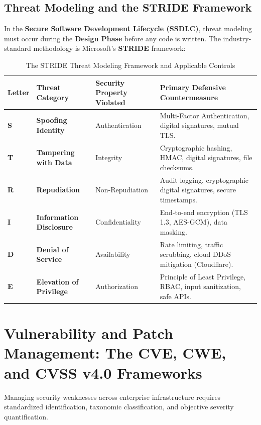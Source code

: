 \subsection{Threat Modeling and the STRIDE Framework}

In the \textbf{Secure Software Development Lifecycle (SSDLC)}, threat modeling must occur during the \textbf{Design Phase} before any code is written. The industry-standard methodology is Microsoft's \textbf{STRIDE} framework:

\begin{table}[htbp]
\centering
\caption{The STRIDE Threat Modeling Framework and Applicable Controls}
\label{tab:stride_model}
\begin{tabularx}{\textwidth}{l p{3.2cm} p{3.8cm} X}
\toprule
\textbf{Letter} & \textbf{Threat Category} & \textbf{Security Property Violated} & \textbf{Primary Defensive Countermeasure} \\
\midrule
\textbf{S} & \textbf{Spoofing Identity} & Authentication & Multi-Factor Authentication, digital signatures, mutual TLS. \\
\textbf{T} & \textbf{Tampering with Data} & Integrity & Cryptographic hashing, HMAC, digital signatures, file checksums. \\
\textbf{R} & \textbf{Repudiation} & Non-Repudiation & Audit logging, cryptographic digital signatures, secure timestamps. \\
\textbf{I} & \textbf{Information Disclosure} & Confidentiality & End-to-end encryption (TLS 1.3, AES-GCM), data masking. \\
\textbf{D} & \textbf{Denial of Service} & Availability & Rate limiting, traffic scrubbing, cloud DDoS mitigation (Cloudflare). \\
\textbf{E} & \textbf{Elevation of Privilege} & Authorization & Principle of Least Privilege, RBAC, input sanitization, safe APIs. \\
\bottomrule
\end{tabularx}
\end{table}



\newpage
\section{Vulnerability and Patch Management: The CVE, CWE, and CVSS v4.0 Frameworks}

Managing security weaknesses across enterprise infrastructure requires standardized identification, taxonomic classification, and objective severity quantification.

